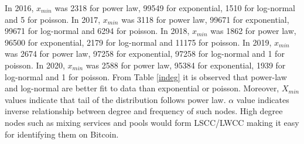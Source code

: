 \documentclass[preprint,12pt]{elsarticle}
\begin{document}
\begin{table}[H]
\centering
\caption{Likelihood ratio tests for comparing in degree distribution (2009-2015)}
\label{indeg}
\end{table}

In 2016, $x_{min}$ was 2318 for power law, 99549 for exponential, 1510 for log-normal and 5 for poisson. In 2017, $x_{min}$ was 3118 for power law, 99671 for exponential, 99671 for log-normal and 6294 for poisson. In 2018, $x_{min}$ was 1862 for power law, 96500 for exponential, 2179 for log-normal and 11175 for poisson. In 2019, $x_{min}$ was 2674 for power law, 97258 for exponential, 97258 for log-normal and 1 for poisson. In 2020, $x_{min}$ was 2588 for power law, 95384 for exponential, 1939 for log-normal and 1 for poisson. From Table \ref{indeg} it is observed that power-law and log-normal are better fit to data than exponential or poisson. Moreover, $X_{min}$ values indicate that tail of the distribution follows power law. $\alpha$ value indicates inverse relationship between degree and frequency of such nodes. High degree nodes such as mixing services and pools would form LSCC/LWCC making it easy for identifying them on Bitcoin.
\end{document}
